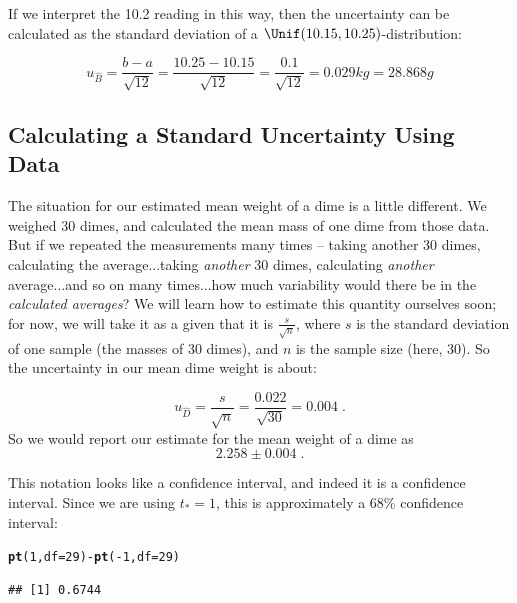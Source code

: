 \documentclass[twoside]{book}\usepackage[]{graphicx}\usepackage[]{xcolor}
\makeatletter
\newcommand{\hlnum}[1]{\textcolor[rgb]{0.686,0.059,0.569}{#1}}%
\newcommand{\hlopt}[1]{\textcolor[rgb]{0,0,0}{#1}}%
\newcommand{\hlstd}[1]{\textcolor[rgb]{0.345,0.345,0.345}{#1}}%
\newcommand{\hlkwc}[1]{\textcolor[rgb]{0.333,0.667,0.333}{#1}}%
\newcommand{\hlkwd}[1]{\textcolor[rgb]{0.737,0.353,0.396}{\textbf{#1}}}%
\newenvironment{kframe}{%
 \def\at@end@of@kframe{}%
 \ifinner\ifhmode%
  \def\at@end@of@kframe{\end{minipage}}%
  \begin{minipage}{\columnwidth}%
 \fi\fi%
 \def\FrameCommand##1{\hskip\@totalleftmargin \hskip-\fboxsep
 \colorbox{shadecolor}{##1}\hskip-\fboxsep
     \hskip-\linewidth \hskip-\@totalleftmargin \hskip\columnwidth}%
 \MakeFramed {\advance\hsize-\width
   \@totalleftmargin\z@ \linewidth\hsize
   \@setminipage}}%
 {\par\unskip\endMakeFramed%
 \at@end@of@kframe}
\newenvironment{knitrout}{}{} %
\makeatother
\begin{document}
If we interpret the 10.2 reading in this way, then the uncertainty can be
calculated as the standard deviation of a $\Unif(10.15, 10.25)$-distribution:  

\[
u_{\hat B} = \frac{b-a}{\sqrt{12}} 
= \frac{10.25-10.15}{\sqrt{12}} 
= \frac{0.1}{\sqrt{12}} 
= 0.029 kg
= 28.868 g
\]

\subsection{Calculating a Standard Uncertainty Using Data}

The situation for our estimated mean weight of a dime is a little different.  We weighed 30 dimes, 
and calculated the mean mass of one dime from those data.  But if we repeated the measurements many times -- 
taking another 30 dimes, calculating the average...taking \emph{another} 30 dimes, calculating 
\emph{another} average...and so on many times...how much variability would there be in the 
\emph{calculated averages}? 
We will learn how to estimate this quantity ourselves soon; for now, 
we will take it as a given that it is $\frac{s}{\sqrt{n}}$, 
where $s$ is the standard deviation of one sample (the masses of 30 dimes), and $n$ is the sample 
size (here, 30). So the uncertainty in our mean dime weight is about:
%

\[
u_{\hat D} = \frac{s}{\sqrt{n}} 
= \frac{0.022}{\sqrt{30}} 
= 0.004\;.
\]
So we would report our estimate for the mean weight of a dime as 
\[
2.258 \pm 0.004 \;.
\]

This notation looks like a confidence interval,
and indeed it is a confidence interval.
Since we are using $t_* = 1$, this is approximately a 68\% confidence interval:
\begin{knitrout}
\color{fgcolor}\begin{kframe}
\begin{alltt}
\hlkwd{pt}\hlstd{(}\hlnum{1}\hlstd{,}\hlkwc{df} \hlstd{=} \hlnum{29}\hlstd{)} \hlopt{-} \hlkwd{pt}\hlstd{(}\hlopt{-}\hlnum{1}\hlstd{,}\hlkwc{df} \hlstd{=} \hlnum{29}\hlstd{)}
\end{alltt}
\begin{verbatim}
## [1] 0.6744
\end{verbatim}
\end{kframe}
\end{knitrout}
% 
\end{document}
